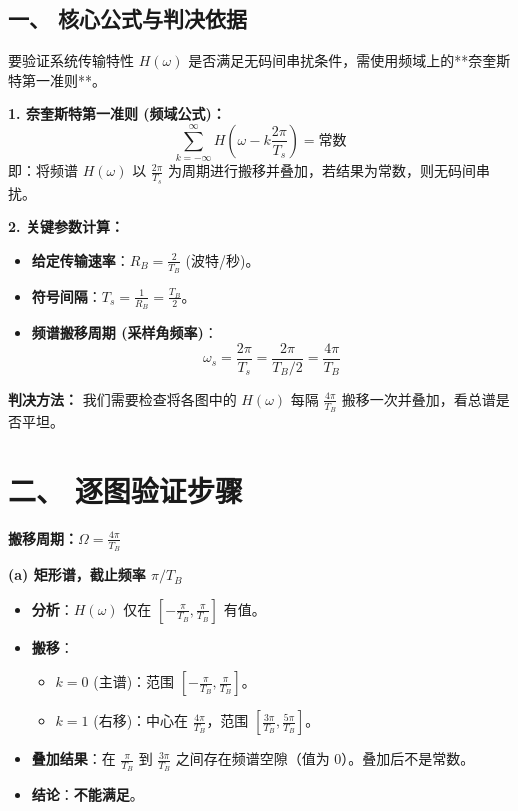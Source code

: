 \documentclass[a4paper,11pt]{ctexart}
\begin{document}
\begin{tcolorbox}[colback=white, colframe=blue!50!black, title=\textbf{题目解答：6-11 验证无码间串扰 (ISI) 条件}]

    \section*{一、 核心公式与判决依据}
    
    要验证系统传输特性 $H(\omega)$ 是否满足无码间串扰条件，需使用频域上的**奈奎斯特第一准则**。
    
    \textbf{1. 奈奎斯特第一准则 (频域公式)：}
    \begin{equation}
        \sum_{k=-\infty}^{\infty} H\left(\omega - k \frac{2\pi}{T_s}\right) = \text{常数}
    \end{equation}
    即：将频谱 $H(\omega)$ 以 $\frac{2\pi}{T_s}$ 为周期进行搬移并叠加，若结果为常数，则无码间串扰。
    
    \textbf{2. 关键参数计算：}
    \begin{itemize}
        \item \textbf{给定传输速率}：$R_B = \frac{2}{T_B}$ (波特/秒)。
        \item \textbf{符号间隔}：$T_s = \frac{1}{R_B} = \frac{T_B}{2}$。
        \item \textbf{频谱搬移周期 (采样角频率)}：
            \begin{equation}
                \omega_s = \frac{2\pi}{T_s} = \frac{2\pi}{T_B / 2} = \frac{4\pi}{T_B}
            \end{equation}
    \end{itemize}
    
    \textbf{判决方法：}
    我们需要检查将各图中的 $H(\omega)$ 每隔 $\frac{4\pi}{T_B}$ 搬移一次并叠加，看总谱是否平坦。
    \end{tcolorbox}

    \section*{二、 逐图验证步骤}
    
    \textbf{搬移周期：$\Omega = \frac{4\pi}{T_B}$}
    
    \textbf{(a) 矩形谱，截止频率 $\pi/T_B$}
    \begin{itemize}
        \item \textbf{分析}：$H(\omega)$ 仅在 $[-\frac{\pi}{T_B}, \frac{\pi}{T_B}]$ 有值。
        \item \textbf{搬移}：
            \begin{itemize}
                \item $k=0$ (主谱)：范围 $[-\frac{\pi}{T_B}, \frac{\pi}{T_B}]$。
                \item $k=1$ (右移)：中心在 $\frac{4\pi}{T_B}$，范围 $[\frac{3\pi}{T_B}, \frac{5\pi}{T_B}]$。
            \end{itemize}
        \item \textbf{叠加结果}：在 $\frac{\pi}{T_B}$ 到 $\frac{3\pi}{T_B}$ 之间存在频谱空隙（值为 0）。叠加后不是常数。
        \item \textbf{结论}：\textbf{不能满足}。
    \end{itemize}
\end{document}
